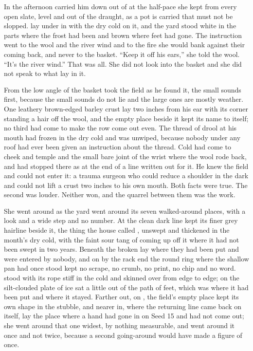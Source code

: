 In the afternoon  carried him down out of  at the half-pace she kept from every open slate, level and out of the draught, as a pot is carried that must not be slopped.  lay under  in  with the dry cold on it, and the yard stood white in the parts where the frost had been and brown where feet had gone. The instruction went to the wool and the river wind and to the fire she would bank against their coming back, and never to the basket. “Keep it off his ears,” she told the wool. “It's the river wind.” That was all. She did not look into the basket and she did not speak to what lay in it.

From the low angle of the basket  took the field as he found it, the small sounds first, because the small sounds do not lie and the large ones are mostly weather. One leathery brown-edged barley crust lay two inches from his ear with its corner standing a hair off the wool, and the empty place beside it kept its name to itself; no third had come to make the row come out even. The thread of drool at his mouth had frozen in the dry cold and was unwiped, because nobody under any roof had ever been given an instruction about the thread. Cold had come to cheek and temple and the small bare joint of the wrist where the wool rode back, and had stopped there as at the end of a line written out for it. He knew the field and could not enter it: a trauma surgeon who could reduce a shoulder in the dark and could not lift a crust two inches to his own mouth. Both facts were true. The second was louder. Neither won, and the quarrel between them was the work.

She went around  as the yard went around its seven walked-around places, with a look and a wide step and no number. At  the clean dark line kept its finer grey hairline beside it, the thing the house called , unswept and thickened in the month's dry cold, with the faint sour tang of  coming up off it where it had not been swept in two years. Beneath  the broken  lay where they had been put and were entered by nobody, and on  by the rack end the round ring where the shallow pan had once stood kept no scrape, no crumb, no print, no chip and no word.  stood with its rope stiff in the cold and  skinned over from edge to edge; on  the silt-clouded plate of ice sat a little out of the path of feet, which was where it had been put and where it stayed. Farther out, on , the field's empty place kept its own shape in the stubble, and nearer in, where the returning line came back on itself, lay the place where a hand had gone in on Seed 15 and had not come out; she went around that one widest, by nothing measurable, and went around it once and not twice, because a second going-around would have made a figure of once.

